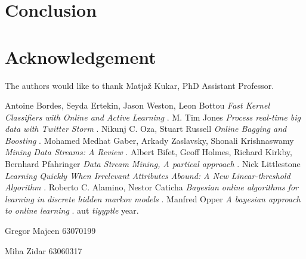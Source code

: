 \documentclass[journal]{IEEEtran/IEEEtran}
\begin{document}
\section{Conclusion}



\appendices

\section*{Acknowledgement}
The authors would like to thank Matjaž Kukar, PhD Assistant Professor.


\begin{thebibliography}{1}
 Antoine Bordes, Seyda Ertekin, Jason Weston, Leon Bottou \emph{Fast Kernel Classifiers with Online and Active Learning} .
 M. Tim Jones \emph{Process real-time big data with Twitter Storm} .
 Nikunj C. Oza, Stuart Russell \emph{Online Bagging and Boosting} \relax .
 Mohamed Medhat Gaber, Arkady Zaslavsky, Shonali Krishnaswamy \emph{Mining Data Streams: A Review} \relax .
 Albert Bifet, Geoff Holmes, Richard Kirkby, Bernhard Pfahringer \emph{Data Stream Mining, A partical approach } .
 Nick Littlestone \emph{Learning Quickly When Irrelevant Attributes Abound: A New Linear-threshold Algorithm } .
 Roberto C. Alamino, Nestor Caticha \emph{Bayesian online algorithms for learning in discrete hidden markov models} .
 Manfred Opper \emph{A bayesian approach to online learning} .
 aut \emph{tiyyptle } \relax year.

\end{thebibliography}

\newpage

\begin{IEEEbiography}{Gregor Majcen}
63070199
\end{IEEEbiography}

\begin{IEEEbiography}{Miha Zidar}
63060317
\end{IEEEbiography}
\end{document}

